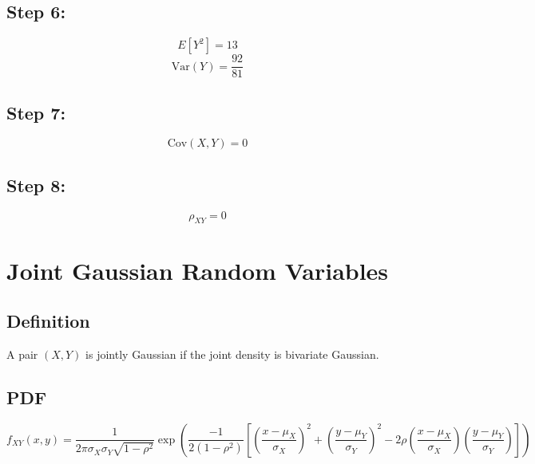 \documentclass[11pt]{article}
\begin{document}
\subsection{Step 6:}
\[
E[Y^2] = 13
\]
\[
\text{Var}(Y) = \frac{92}{81}
\]

\subsection{Step 7:}
\[
\text{Cov}(X,Y) = 0
\]

\subsection{Step 8:}
\[
\rho_{XY} = 0
\]

\section{Joint Gaussian Random Variables}

\subsection{Definition}
A pair $(X,Y)$ is jointly Gaussian if the joint density is bivariate Gaussian.

\subsection{PDF}
\[
f_{XY}(x,y) =
\frac{1}{2\pi\sigma_X\sigma_Y\sqrt{1-\rho^2}}
\exp\left(
\frac{-1}{2(1-\rho^2)}
\left[
\left(\frac{x-\mu_X}{\sigma_X}\right)^2 +
\left(\frac{y-\mu_Y}{\sigma_Y}\right)^2 -
2\rho \left(\frac{x-\mu_X}{\sigma_X}\right)\left(\frac{y-\mu_Y}{\sigma_Y}\right)
\right]
\right)
\]

\end{document}
